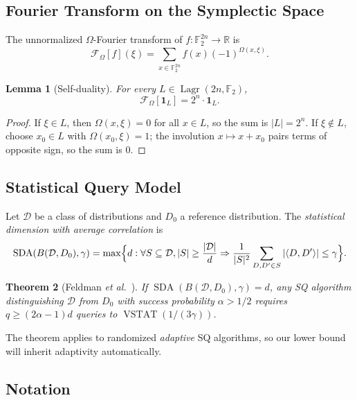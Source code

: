 \documentclass[11pt,a4paper]{article}
\theoremstyle{plain}
\newtheorem{theorem}{Theorem}[section]
\newtheorem{lemma}[theorem]{Lemma}
\theoremstyle{definition}
\newcommand{\F}{\mathbb{F}}
\DeclareMathOperator{\Lagr}{Lagr}
\DeclareMathOperator{\SDA}{SDA}
\DeclareMathOperator{\VSTAT}{VSTAT}
\newcommand{\etal}{\textit{et al.}}
\newcommand{\R}{\mathbb{R}}
\begin{document}
\subsection{Fourier Transform on the Symplectic Space}
\label{subsec:fourier}

The unnormalized $\Omega$-Fourier transform of $f \colon \F_2^{2n} \to \R$ is
\[
\mathcal{F}_\Omega[f](\xi) = \sum_{x \in \F_2^{2n}} f(x) (-1)^{\Omega(x, \xi)}.
\]

\begin{lemma}[Self-duality]
For every $L \in \Lagr(2n,\F_2)$,
\[
\mathcal{F}_\Omega[\mathbf{1}_L] = 2^n \cdot \mathbf{1}_L.
\]
\end{lemma}

\begin{proof}
If $\xi \in L$, then $\Omega(x,\xi)=0$ for all $x \in L$, so the sum is $|L|=2^n$. If $\xi \notin L$, choose $x_0 \in L$ with $\Omega(x_0,\xi)=1$; the involution $x \mapsto x+x_0$ pairs terms of opposite sign, so the sum is $0$.
\end{proof}

\subsection{Statistical Query Model}
\label{subsec:sq}

Let $\mathcal{D}$ be a class of distributions and $D_0$ a reference distribution. The \emph{statistical dimension with average correlation} \cite{FGR+17} is
\[
\SDA(B(\mathcal{D},D_0),\gamma) = \max\Bigl\{d : \forall S \subseteq \mathcal{D}, |S| \geq \frac{|\mathcal{D}|}{d} \Rightarrow \frac{1}{|S|^2}\sum_{D,D' \in S} |\langle D,D' \rangle| \leq \gamma\Bigr\}.
\]

\begin{theorem}[Feldman \etal\ \cite{FGR+17}]
\label{thm:feldman}
If $\SDA(B(\mathcal{D},D_0),\gamma) = d$, any SQ algorithm distinguishing $\mathcal{D}$ from $D_0$ with success probability $\alpha > 1/2$ requires $q \geq (2\alpha - 1)d$ queries to $\VSTAT(1/(3\gamma))$.
\end{theorem}

The theorem applies to randomized \emph{adaptive} SQ algorithms, so our lower bound will inherit adaptivity automatically.

\subsection{Notation}
\label{subsec:notation}
\end{document}
